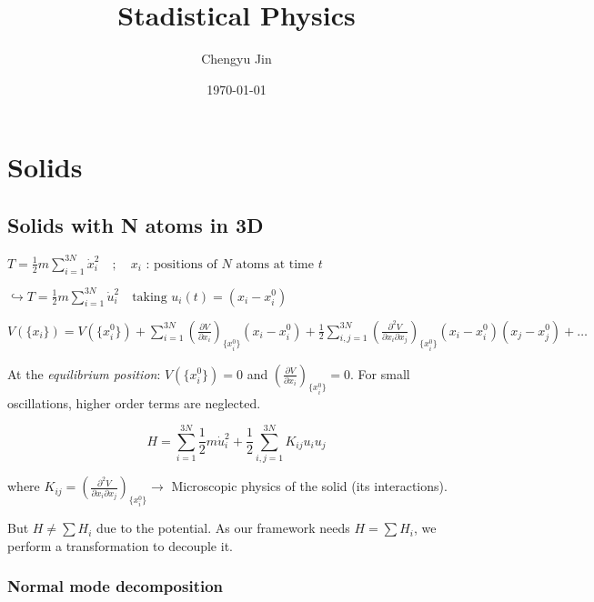 \documentclass[12pt,a4paper]{report}
\title{Stadistical Physics}
\author{Chengyu Jin}
\date{\today}
\newcommand{\esp}{\vspace{0.5cm}}
\begin{document}
	
	\maketitle
	
	\tableofcontents
	\newpage
	
	\chapter{Solids}
	
	\section{Solids with N atoms in 3D}
	
	$T = \frac{1}{2} m \sum_{i=1}^{3N} \dot{x}_i^2 \quad ; \quad x_i \text{ : positions of } N \text{ atoms at time } t$
	
	\esp
	
	$\hookrightarrow T = \frac{1}{2} m \sum_{i=1}^{3N} \dot{u}_i^2 \quad \text{taking } u_i(t) = (x_i - x_i^0)$
	
	\esp
	
	$V(\{x_i\}) = V(\{x_i^0\}) + \sum_{i=1}^{3N} \left( \frac{\partial V}{\partial x_i} \right)_{\{x_i^0\}} (x_i - x_i^0) + \frac{1}{2} \sum_{i,j=1}^{3N} \left( \frac{\partial^2 V}{\partial x_i \partial x_j} \right)_{\{x_i^0\}} (x_i - x_i^0)(x_j - x_j^0) + \dots$
	
	\esp
	
	At the \textit{equilibrium position}: $V(\{x_i^0\}) = 0$ and $\left( \frac{\partial V}{\partial x_i} \right)_{\{x_i^0\}} = 0$.
	For small oscillations, higher order terms are neglected.
	
	\esp
	
	\begin{equation}
		H = \sum_{i=1}^{3N} \frac{1}{2} m \dot{u}_i^2 + \frac{1}{2} \sum_{i,j=1}^{3N} K_{ij} u_i u_j
	\end{equation}
	
	where $K_{ij} = \left( \frac{\partial^2 V}{\partial x_i \partial x_j} \right)_{\{x_i^0\}} \rightarrow$ Microscopic physics of the solid (its interactions).
	
	\esp
	
	But $H \neq \sum H_i$ due to the potential. As our framework needs $H = \sum H_i$, we perform a transformation to decouple it.
	

	\subsection{Normal mode decomposition}
	
\end{document}
